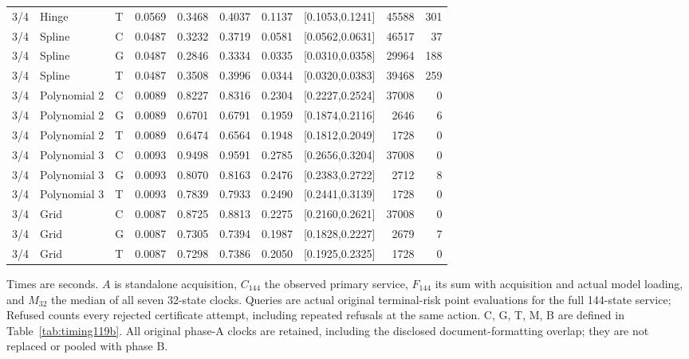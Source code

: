 \begin{longtable}{lllrrrrlrr}
3/4 & Hinge & T & 0.0569 & 0.3468 & 0.4037 & 0.1137 & [0.1053,0.1241] & 45588 & 301 \\
3/4 & Spline & C & 0.0487 & 0.3232 & 0.3719 & 0.0581 & [0.0562,0.0631] & 46517 & 37 \\
3/4 & Spline & G & 0.0487 & 0.2846 & 0.3334 & 0.0335 & [0.0310,0.0358] & 29964 & 188 \\
3/4 & Spline & T & 0.0487 & 0.3508 & 0.3996 & 0.0344 & [0.0320,0.0383] & 39468 & 259 \\
3/4 & Polynomial 2 & C & 0.0089 & 0.8227 & 0.8316 & 0.2304 & [0.2227,0.2524] & 37008 & 0 \\
3/4 & Polynomial 2 & G & 0.0089 & 0.6701 & 0.6791 & 0.1959 & [0.1874,0.2116] & 2646 & 6 \\
3/4 & Polynomial 2 & T & 0.0089 & 0.6474 & 0.6564 & 0.1948 & [0.1812,0.2049] & 1728 & 0 \\
3/4 & Polynomial 3 & C & 0.0093 & 0.9498 & 0.9591 & 0.2785 & [0.2656,0.3204] & 37008 & 0 \\
3/4 & Polynomial 3 & G & 0.0093 & 0.8070 & 0.8163 & 0.2476 & [0.2383,0.2722] & 2712 & 8 \\
3/4 & Polynomial 3 & T & 0.0093 & 0.7839 & 0.7933 & 0.2490 & [0.2441,0.3139] & 1728 & 0 \\
3/4 & Grid & C & 0.0087 & 0.8725 & 0.8813 & 0.2275 & [0.2160,0.2621] & 37008 & 0 \\
3/4 & Grid & G & 0.0087 & 0.7305 & 0.7394 & 0.1987 & [0.1828,0.2227] & 2679 & 7 \\
3/4 & Grid & T & 0.0087 & 0.7298 & 0.7386 & 0.2050 & [0.1925,0.2325] & 1728 & 0 \\
\end{longtable}
\noindent Times are seconds. $A$ is standalone acquisition, $C_{144}$ the observed primary service, $F_{144}$ its sum with acquisition and actual model loading, and $M_{32}$ the median of all seven 32-state clocks. Queries are actual original terminal-risk point evaluations for the full 144-state service; Refused counts every rejected certificate attempt, including repeated refusals at the same action. C, G, T, M, B are defined in Table~\ref{tab:timing119b}. All original phase-A clocks are retained, including the disclosed document-formatting overlap; they are not replaced or pooled with phase B.
\endgroup

